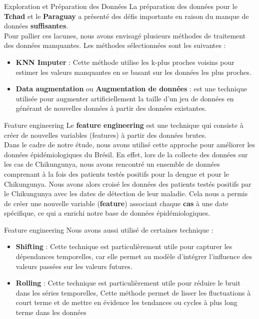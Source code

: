 \documentclass[aspectratio=169,xcolor=dvipsnames, t]{beamer}
\begin{document}
	\begin{frame}{Exploration et Préparation des Données}
		\justifying
		\qquad La préparation des données pour le \textbf{Tchad} et le \textbf{Paraguay} a présenté des défis importants en raison du manque de données \textbf{suffisantes}.\\
		\pause[2]
		Pour pallier ces lacunes, nous avons envisagé plusieurs méthodes de traitement des données manquantes. Les méthodes sélectionnées sont les suivantes :
		\pause[3]
		\begin{itemize}
			\item \textbf{KNN Imputer} : Cette méthode utilise les k-plus proches voisins pour estimer les valeurs manquantes en se basant sur les données les plus proches.
			\pause[4]
			\item \textbf{Data  augmentation} ou \textbf{Augmentation de données} : est une technique utilisée pour augmenter artificiellement la taille d'un jeu de données en générant de nouvelles données à partir des données existantes.
		\end{itemize}
	\end{frame}
	\begin{frame}{Feature engineering}
		\justifying
		\qquad Le \textbf{feature engineering} est une technique qui consiste à créer de nouvelles variables (features) à partir des données brutes.\\
		\pause[2]
		\qquad Dans le cadre de notre étude, nous avons utilisé cette approche pour améliorer les données épidémiologiques du Brésil. En effet, lors de la collecte des données sur les cas de Chikungunya, nous avons rencontré un ensemble de données comprenant à la fois des patients testés positifs pour la dengue et pour le Chikungunya. Nous avons alors croisé les données des patients testés positifs par le Chikungunya avec les dates de détection de leur maladie. Cela nous a permis de créer une nouvelle variable (\textbf{feature}) associant chaque \textbf{cas} à une date spécifique, ce qui a enrichi notre base de données épidémiologiques.
	\end{frame}
	\begin{frame}{Feature engineering}
		\justifying
		Nous avons aussi utilisé de certaines technique :
		\pause[2]
		\begin{itemize}
			\justifying
			\item \textbf{Shifting} : Cette technique est particulièrement utile pour capturer les dépendances temporelles, car elle permet au modèle d'intégrer l'influence des valeurs passées sur les valeurs futures.
			\pause[3]
			\item  \textbf{Rolling} :  Cette technique est particulièrement utile pour réduire le bruit dans les séries temporelles, Cette méthode permet de lisser les fluctuations à court terme et de mettre en évidence les tendances ou cycles à plus long terme dans les données
		\end{itemize}
	\end{frame}
\end{document}
